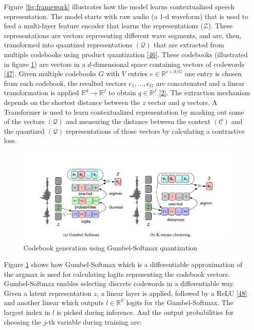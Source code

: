 \documentclass[
  a4paper,
]{article}
\begin{document}
Figure \ref{fig:framework} illustrates how the model learns
contextualized speech representation. The model starts with raw audio (a
1-d waveform) that is used to feed a multi-layer feature encoder that
learns the representations (\(\mathcal{Z}\)). These representations are
vectors representing different wave segments, and are, then, transformed
into quantized representations \((\mathcal{Q})\) that are extracted from
multiple codebooks using product quantization
\protect\hyperlink{ref-5432202}{{[}46{]}}. These codebooks (illustrated
in figure \ref{fig:codebook}) are vectors in a \(d\)-dimensional space
containing vectors of codewords
\protect\hyperlink{ref-dieleman2018challenge}{{[}47{]}}. Given multiple
codebooks \(G\) with \(V\) entries \(e \in \mathbb{R}^{v\times{d}/G}\)
one entry is chosen from each codebook, the resulted vectors
\(e_1,...,e_G\) are concatenated and a linear transformation is applied
\(\mathbb{R}^d \to \mathbb{R}^f\) to obtain \(q \in \mathbb{R}^f\)
\protect\hyperlink{ref-2020arXiv200611477B}{{[}2{]}}. The extraction
mechanism depends on the shortest distance between the \(z\) vector and
\(q\) vectors. A Transformer is used to learn contextualized
representation by masking out some of the vectors \((\mathcal{Q})\) and
measuring the distance between the context \((\mathcal{C})\) and the
quantized \((\mathcal{Q})\) representations of those vectors by
calculating a contrastive loss.

\begin{figure}

{\centering \includegraphics{codebook} 

}

\caption{Codebook generation using Gumbel-Softmax quantization}\label{fig:codebook}
\end{figure}

Figure \ref{fig:codebook} shows how Gumbel-Softmax which is a
differentiable approximation of the argmax is used for calculating
logits representing the codebook vectors. Gumbel-Softmax enables
selecting discrete codewords in a differentiable way. Given a latent
representation \(z\), a linear layer is applied, followed by a ReLU
\protect\hyperlink{ref-agarap2019deep}{{[}48{]}} and another linear
which outputs \(l \in \mathbb{R}^V\) logits for the Gumbel-Softmax. The
largest index in \(l\) is picked during inference. And the output
probabilities for choosing the \(j\)-th variable during training are:
\end{document}
